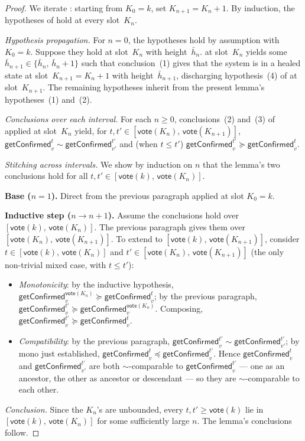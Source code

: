 \ifx\litemode\undefined\documentclass{article}\fi
\newcommand{\vote}{\mathsf{vote}}
\newcommand{\comm}[1]{\bar{#1}}
\newcommand{\getConfirmed}{\textsf{getConfirmed}\xspace}
\theoremstyle{plain}
\theoremstyle{definition}
\theoremstyle{remark}
\begin{document}
\begin{proof}
We iterate : starting from $K_0 = k$, set $K_{n+1} = K_n + 1$. By induction, the hypotheses of  hold at every slot~$K_n$.

\emph{Hypothesis propagation.}
For $n = 0$, the hypotheses hold by assumption with $K_0 = k$. Suppose they hold at slot~$K_n$ with height~$\comm{h}_n$.  at slot~$K_n$ yields some $\comm{h}_{n+1} \in \{\comm{h}_n,\, \comm{h}_n + 1\}$ such that conclusion~(1) gives that the system is in a healed state at slot~$K_{n+1} = K_n + 1$ with height~$\comm{h}_{n+1}$, discharging hypothesis~(4) of  at slot~$K_{n+1}$. The remaining hypotheses inherit from the present lemma's hypotheses~(1) and~(2).

\emph{Conclusions over each interval.}
For each $n \geq 0$, conclusions~(2) and~(3) of  applied at slot~$K_n$ yield, for $t, t' \in [\vote(K_n),\, \vote(K_{n+1})]$, $\getConfirmed_v^t \sim \getConfirmed_{v'}^{t'}$ and (when $t \leq t'$) $\getConfirmed_v^{t'} \succeq \getConfirmed_v^t$.

\emph{Stitching across intervals.}
We show by induction on $n$ that the lemma's two conclusions hold for all $t, t' \in [\vote(k),\, \vote(K_n)]$.

\textbf{Base ($n = 1$).}
Direct from the previous paragraph applied at slot $K_0 = k$.

\textbf{Inductive step ($n \to n+1$).}
Assume the conclusions hold over $[\vote(k),\, \vote(K_n)]$. The previous paragraph gives them over $[\vote(K_n),\, \vote(K_{n+1})]$. To extend to $[\vote(k),\, \vote(K_{n+1})]$, consider $t \in [\vote(k),\, \vote(K_n)]$ and $t' \in [\vote(K_n),\, \vote(K_{n+1})]$ (the only non-trivial mixed case, with $t \leq t'$):
\begin{itemize}
  \item \emph{Monotonicity}: by the inductive hypothesis, $\getConfirmed_v^{\vote(K_n)} \succeq \getConfirmed_v^t$; by the previous paragraph, $\getConfirmed_v^{t'} \succeq \getConfirmed_v^{\vote(K_n)}$. Composing, $\getConfirmed_v^{t'} \succeq \getConfirmed_v^t$.
  \item \emph{Compatibility}: by the previous paragraph, $\getConfirmed_v^{t'} \sim \getConfirmed_{v'}^{t'}$; by mono just established, $\getConfirmed_v^t \preceq \getConfirmed_v^{t'}$. Hence $\getConfirmed_v^t$ and $\getConfirmed_{v'}^{t'}$ are both $\sim$-comparable to $\getConfirmed_v^{t'}$ — one as an ancestor, the other as ancestor or descendant — so they are $\sim$-comparable to each other.
\end{itemize}

\emph{Conclusion.}
Since the $K_n$'s are unbounded, every $t, t' \geq \vote(k)$ lie in $[\vote(k),\, \vote(K_n)]$ for some sufficiently large $n$. The lemma's conclusions follow.
\end{proof}
\end{document}
